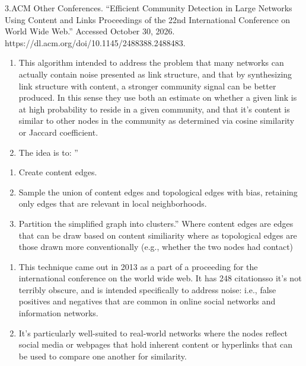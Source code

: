 \documentclass[11pt]{article}
\providecommand{\tightlist}{%
      \setlength{\itemsep}{0pt}\setlength{\parskip}{0pt}}
\begin{document}
3.ACM Other Conferences. ``Efficient Community Detection in Large
Networks Using Content and Links \textbar{} Proceedings of the 22nd
International Conference on World Wide Web.'' Accessed October 30, 2026.
https://dl.acm.org/doi/10.1145/2488388.2488483.

\begin{enumerate}
\def\labelenumi{(\alph{enumi})}
\tightlist
\item
  This algorithm intended to address the problem that many networks can
  actually contain noise presented as link structure, and that by
  synthesizing link structure with content, a stronger community signal
  can be better produced. In this sense they use both an estimate on
  whether a given link is at high probability to reside in a given
  community, and that it's content is similar to other nodes in the
  community as determined via cosine similarity or Jaccard coefficient.
\item
  The idea is to: ''
\end{enumerate}

\begin{enumerate}
\def\labelenumi{\arabic{enumi}.}
\tightlist
\item
  Create content edges.
\item
  Sample the union of content edges and topological edges with bias,
  retaining only edges that are relevant in local neighborhoods.
\item
  Partition the simpliﬁed graph into clusters.'' Where content edges are
  edges that can be draw based on content similiarity where as
  topological edges are those drawn more conventionally (e.g., whether
  the two nodes had contact)
\end{enumerate}

\begin{enumerate}
\def\labelenumi{(\alph{enumi})}
\setcounter{enumi}{2}
\tightlist
\item
  This technique came out in 2013 as a part of a proceeding for the
  international conference on the world wide web. It has 248 citationsso
  it's not terribly obscure, and is intended specifically to address
  noise: i.e., false positives and negatives that are common in online
  social networks and information networks.
\item
  It's particularly well-suited to real-world networks where the nodes
  reflect social media or webpages that hold inherent content or
  hyperlinks that can be used to compare one another for similarity.
\end{enumerate}
\end{document}
